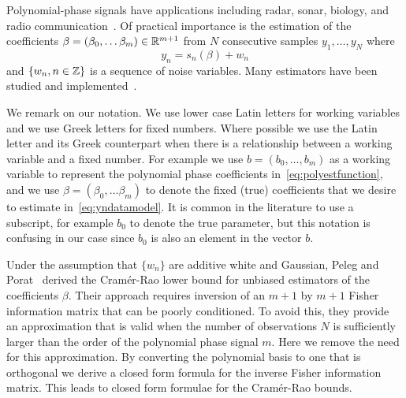 \documentclass[5p]{elsarticle}
\begin{document}
Polynomial-phase signals have applications including radar, sonar, biology, and radio communication~\cite{Angeby_estimating_2000,Levanon_Radar_signals_2004,gershman_estimating_2001,Hlawatsch_lin_quad_time_freq_spmag_1992}.  %
Of practical importance is the estimation of the coefficients $\beta = (\beta_0, \dots \beta_m)\in{\mathbb R}^{m+1}$ from $N$ consecutive samples $y_1, \dots, y_N$ where 
\begin{equation}\label{eq:yndatamodel}
y_n = s_n(\beta) + w_n
\end{equation}
and $\{w_n, n \in {\mathbb Z}\}$ is a sequence of noise variables.  Many estimators have been studied and implemented~\cite{Angeby_estimating_2000,Peleg_DPT_1995, Djuric_phase_unwrap_chirp_1990, Oshea_iterative_1996, Morelande_bayes_unwrapping_2008, Kitchen_polyphase_unwrapping_1994}.  

We remark on our notation.  We use lower case Latin letters for working variables and we use Greek letters for fixed numbers.  Where possible we use the Latin letter and its Greek counterpart when there is a relationship between a working variable and a fixed number.  For example we use $b=(b_0,\dots,b_m)$ as a working variable to represent the polynomial phase coefficients in~\eqref{eq:polyestfunction}, and we use $\beta = (\beta_0, \dots \beta_m)$ to denote the fixed (true) coefficients that we desire to estimate in~\eqref{eq:yndatamodel}.  It is common in the literature to use a subscript, for example $b_0$ to denote the true parameter, but this notation is confusing in our case since $b_0$ is also an element in the vector $b$.

Under the assumption that $\{w_n\}$ are additive white and Gaussian, Peleg and Porat~\cite{Peleg1991_CRB_PPS_1991} derived the Cram\'{e}r-Rao lower bound for unbiased estimators of the coefficients $\beta$.  Their approach requires inversion of an $m+1$ by $m+1$ Fisher information matrix that can be poorly conditioned.  To avoid this, they provide an approximation that is valid when the number of observations $N$ is sufficiently larger than the order of the polynomial phase signal $m$.  Here we remove the need for this approximation.  By converting the polynomial basis to one that is orthogonal we derive a closed form formula for the inverse Fisher information matrix.  This leads to closed form formulae for the Cram\'{e}r-Rao bounds.  %
\end{document}
